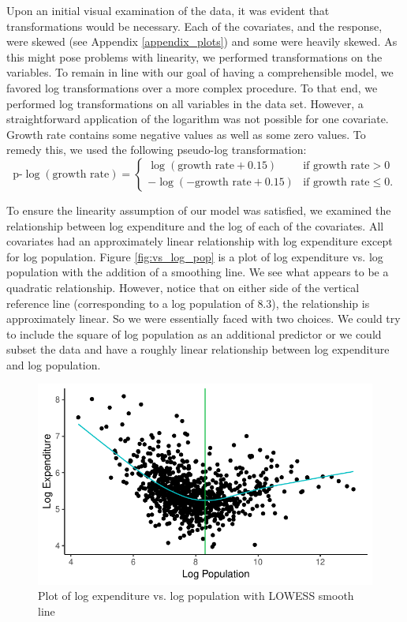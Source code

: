 \documentclass{article}\usepackage[]{graphicx}\usepackage[]{color}
\makeatletter
\def\maxwidth{ %
  \ifdim\Gin@nat@width>\linewidth
    \linewidth
  \else
    \Gin@nat@width
  \fi
}
\newenvironment{knitrout}{}{} %
\makeatother
\begin{document}
Upon an initial visual examination of the data, it was evident that transformations would be necessary. Each of the covariates, and the response, were skewed (see Appendix \ref{appendix_plots}) and some were heavily skewed. As this might pose problems with linearity, we performed transformations on the variables. To remain in line with our goal of having a comprehensible model, we favored log transformations over a more complex procedure. To that end, we performed log transformations on all variables in the data set.  However, a straightforward application of the logarithm was not possible for one covariate. Growth rate contains some negative values as well as some zero values. To remedy this, we used the following pseudo-log transformation:
\[
\text{p-}\log(\text{growth rate}) = %
  \begin{cases}
    \log(\text{growth rate} + 0.15) &\text{if growth rate} > 0 \\
    -\log(-\text{growth rate} + 0.15) &\text{if growth rate} \le 0.
  \end{cases}
\]

To ensure the linearity assumption of our model was satisfied, we examined the relationship between log expenditure and the log of each of the covariates. All covariates had an approximately linear relationship with log expenditure except for log population. Figure \ref{fig:vs_log_pop} is a plot of log expenditure vs. log population with the addition of a smoothing line. We see what appears to be a quadratic relationship. However, notice that on either side of the vertical reference line (corresponding to a log population of $8.3$), the relationship is approximately linear. So we were essentially faced with two choices. We could try to include the square of log population as an additional predictor or we could subset the data and have a roughly linear relationship between log expenditure and log population.




\begin{knitrout}
\color{fgcolor}\begin{figure}[h]
\includegraphics[width=\maxwidth]{figure/r_fig_vs_log_pop-1} \caption{\label{fig:vs_log_pop} Plot of log expenditure vs. log population with LOWESS smooth line}\label{fig:r fig_vs_log_pop}
\end{figure}


\end{knitrout}
\end{document}
